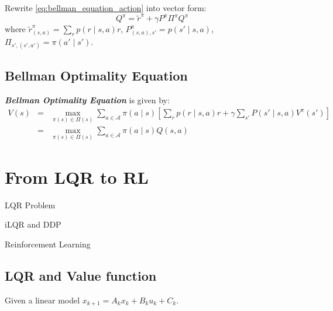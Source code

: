 \documentclass[10pt]{elegantbook}
\newcommand{\mydefination}[1]{\textbf{\textit{\textcolor{structurecolor}{#1}}}}
\begin{document}
Rewrite \ref{eq:bellman_equation_action} into vector form:
\begin{equation}
    Q^{\pi} = \tilde r^{\pi} + \gamma P^{\pi} \Pi^{\pi} Q^{\pi}
\end{equation}
where $\tilde r^{\pi}_{(s,a)} = \sum_r p(r \mid s, a)r$, 
$P^{\pi}_{(s, a), s'} = p(s' \mid s, a)$, $\Pi_{s', (s', a')} = \pi(a' \mid s')$.

\section{Bellman Optimality Equation}
\mydefination{Bellman Optimality Equation} is given by:
\begin{equation}
    \begin{array}{lll}
    V(s) &=& \max_{\pi(s) \in \Pi(s)} \sum_{a \in \mathcal A}\pi(a\mid s) \left [ \sum_r p(r \mid s, a) r + \gamma \sum_{s'}P(s' \mid s, a)V^{\pi}(s') \right ] \\
         &=& \max_{\pi(s) \in \Pi(s)} \sum_{a \in \mathcal A}\pi(a\mid s) Q(s, a)
    \end{array}
\end{equation}

\chapter{From LQR to RL}

\begin{introduction}
    \item LQR Problem
    \item iLQR and DDP
    \item Reinforcement Learning
\end{introduction}

\section{LQR and Value function}

Given a linear model $x_{k+1} = A_k x_k + B_k u_k + C_k$.
\end{document}
